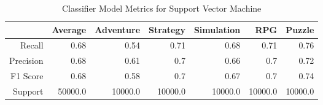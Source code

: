\begin{table}[h]
    \centering
    \begin{tabular}{r|r|r|r|r|r|r}
        & Average & Adventure & Strategy & Simulation & RPG & Puzzle \\\hline
        Recall      & 0.68 & 0.54 & 0.71 & 0.68 & 0.71 & 0.76\\
        Precision   & 0.68 & 0.61 & 0.7 & 0.66 & 0.7 & 0.72\\
        F1 Score    & 0.68 & 0.58 & 0.7 & 0.67 & 0.7 & 0.74\\
        Support     & 50000.0 & 10000.0 & 10000.0 & 10000.0 & 10000.0 & 10000.0
\end{tabular}
    \caption{Classifier Model Metrics for Support Vector Machine}
    \label{tab:model_metrics_support_vector_machine}
\end{table}